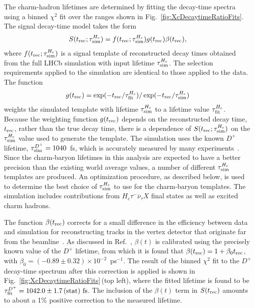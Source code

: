 \documentclass[12pt,a4paper]{article}
\def\Pnu         {\ensuremath{\upnu}\xspace}
\def\Ptau        {\ensuremath{\uptau}\xspace}
\def\PD      {\ensuremath{\mathrm{D}}\xspace}
\def\Pnu         {\ensuremath{\nu}\xspace}
\def\Ptau        {\ensuremath{\tau}\xspace}
\def\PD      {\ensuremath{D}\xspace}
\def\taum       {{\ensuremath{\Ptau^-}}\xspace}
\def\neub       {{\ensuremath{\overline{\Pnu}}}\xspace}
\def\neutb      {{\ensuremath{\neub_\tau}}\xspace}
\def\D       {{\ensuremath{\PD}}\xspace}
\def\Dp      {{\ensuremath{\D^+}}\xspace}
\newcommand{\aunit}[1]{\ensuremath{\text{\,#1}}}
\newcommand{\stat}{\aunit{(stat)}\xspace}
\begin{document}
The charm-hadron lifetimes are determined by fitting the decay-time spectra using a binned $\chi^2$ fit over the
ranges shown in Fig.~\ref{fig:XcDecaytimeRatioFits}. The signal decay-time model takes the form
\begin{align}
S(t_{\rm rec};\tau_{\rm sim}^{H_c}) = f(t_{\rm rec};\tau_{\rm sim}^{H_c}) g(t_{\rm rec}) \beta(t_{\rm rec}),
\end{align}
where $f(t_{\rm rec};\tau_{\rm sim}^{H_c})$ is a signal template of reconstructed decay times obtained from the full LHCb simulation
with input lifetime $\tau_{\rm sim}^{H_c}$. The selection requirements applied to the simulation are identical to those applied to the
data. The function
\begin{align}
g(t_{\rm rec})=\exp(-t_{\rm rec}/\tau_{\rm fit}^{H_c}) / \exp(-t_{\rm rec}/\tau_{\rm sim}^{H_c})
\label{eq:gt}
\end{align}
\noindent weights the simulated template with lifetime $\tau_{\rm sim}^{H_c}$ to a lifetime value
$\tau_{\rm fit}^{H_c}$. Because the weighting function $g(t_{\rm rec})$ depends on 
the reconstructed decay time, $t_{\rm rec}$, rather than the true decay time, there is a dependence of 
$S(t_{\rm rec};\tau_{\rm sim}^{H_c})$ on the $\tau_{\rm sim}^{H_c}$ value used to generate the template.
The simulation uses the known $\Dp$ lifetime, $\tau_{\rm sim}^{\Dp}=1040$~fs, which is accurately measured
by many experiments~\cite{PDG2018}. 
Since the charm-baryon lifetimes in this analysis are expected to have a better precision 
than the existing world average values, a number of different $\tau_{\rm sim}^{H_c}$ templates are produced.
An optimization procedure, as described below, is used to determine the
best choice of $\tau_{\rm sim}^{H_c}$ to use for the charm-baryon templates.
The simulation includes contributions from $H_c\taum\neutb X$ final states as well as excited charm hadrons.

The function $\beta(t_{\rm rec})$ corrects for a small difference in the efficiency
between data and simulation for reconstructing tracks in the vertex detector that originate far from the beamline~\cite{LHCb-PAPER-2013-065}. 
As discussed in Ref.~\cite{LHCb-PAPER-2018-028}, $\beta(t)$ is calibrated using the precisely known value of the $\Dp$ lifetime,
from which it is found that $\beta(t_{\rm rec}) = 1+\beta_0 t_{\rm rec}$, with
$\beta_0 = (-0.89\pm0.32)\times10^{-2}$~ps$^{-1}$.  The result of the binned $\chi^2$ fit to the $\Dp$ decay-time spectrum 
after this correction is applied is shown in Fig.~\ref{fig:XcDecaytimeRatioFits}\,(top left), where the fitted lifetime is 
found to be ${\tau_{\rm fit}^{\Dp}=1042.0\pm1.7\stat~\rm{fs}}$. The inclusion of the $\beta(t)$ term in $S(t_{\rm rec})$ amounts to about a 
1\% positive correction to the measured lifetime.
\end{document}
